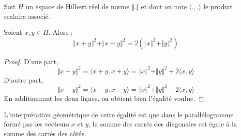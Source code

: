 





  Soit $H$ un espace de Hilbert réel de norme $\Vert . \Vert$ et dont on note $\langle ., . \rangle$ le produit scalaire associé.


  \begin{lemma}
    \label{projection-sur-un-convexe-ferme-1}
    Soient $x, y \in H$. Alors :
    \[ \Vert x + y \Vert^2 + \Vert x - y \Vert^2 = 2(\Vert x \Vert^2 + \Vert y \Vert^2) \]
  \end{lemma}

  \begin{proof}
    D'une part,
    \[ \Vert x + y \Vert^2 = \langle x + y, x + y \rangle = \Vert x \Vert^2 + \Vert y \Vert^2 + 2 \langle x, y \rangle \]
    D'autre part,
    \[ \Vert x - y \Vert^2 = \langle x - y, x - y \rangle = \Vert x \Vert^2 + \Vert y \Vert^2 - 2 \langle x, y \rangle \]
    En additionnant les deux lignes, on obtient bien l'égalité voulue.
  \end{proof}

  \begin{remark}
    L'interprétation géométrique de cette égalité est que dans le parallélogramme formé par les vecteurs $x$ et $y$, la somme des carrés des diagonales est égale à la somme des carrés des côtés.
    \begin{center}
    \end{center}
  \end{remark}

